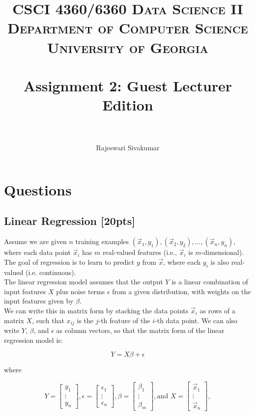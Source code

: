 \documentclass[paper=a4, fontsize=11pt]{scrartcl} %
\title{
\normalfont \normalsize
\textsc{CSCI 4360/6360 Data Science II} \\
\textsc{Department of Computer Science} \\
\textsc{University of Georgia} \\ [15pt] %
\horrule{0.5pt} \\[0.3cm] %
\huge Assignment 2: Guest Lecturer Edition \\ %
\horrule{2pt} \\[0.4cm] %
}
\author{Rajeswari Sivakumar} %
\numberwithin{figure}{section} %
\numberwithin{table}{section} %
\begin{document}
\maketitle %


\section*{Questions}
\setcounter{subsection}{0}

\subsection{Linear Regression \textbf{[20pts]}}

Assume we are given $n$ training examples $(\vec{x}_1, y_1), (\vec{x}_2, y_2), ..., (\vec{x}_n, y_n)$, where each data point $\vec{x}_i$ has $m$ real-valued features (i.e., $\vec{x}_i$ is $m$-dimensional). The goal of regression is to learn to predict $y$ from $\vec{x}$, where each $y_i$ is also real-valued (i.e. continuous). \\

The linear regression model assumes that the output $Y$ is a linear combination of input features $X$ plus noise terms $\epsilon$ from a given distribution, with weights on the input features given by $\beta$. \\

We can write this in matrix form by stacking the data points $\vec{x}_i$ as rows of a matrix $X$, such that $x_{ij}$ is the $j$-th feature of the $i$-th data point. We can also write $Y$, $\beta$, and $\epsilon$ as column vectors, so that the matrix form of the linear regression model is:

$$
Y = X\beta + \epsilon
$$

where

$$
Y =
\begin{bmatrix}
	y_1 \\
	\vdots \\
	y_n
\end{bmatrix},
\epsilon =
\begin{bmatrix}
	\epsilon_1 \\
	\vdots \\
	\epsilon_n
\end{bmatrix},
\beta =
\begin{bmatrix}
	\beta_1 \\
	\vdots \\
	\beta_m
\end{bmatrix},
\textrm{and } X =
\begin{bmatrix}
	\vec{x}_1 \\
	\vdots \\
	\vec{x}_n
\end{bmatrix},
$$
\end{document}
